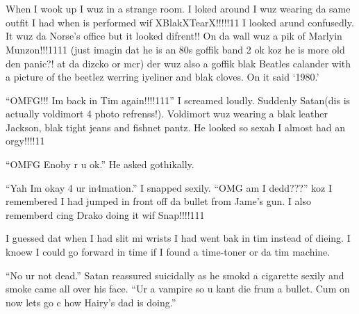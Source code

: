 \section{\chaptername~\thesection}



When I wook up I wuz in a strange room. I loked around I wuz wearing da same outfit I had when is performed wif XBlakXTearX!!!!!11 I looked arund confusedly. It wuz da Norse's office but it looked difrent!! On da wall wuz a pik of Marlyin Munzon!!!1111 (just imagin dat he is an 80s goffik band 2 ok koz he is more old den panic?! at da dizcko or mcr) der wuz also a goffik blak Beatles calander with a picture of the beetlez werring iyeliner and blak cloves. On it said \enquote*{1980.}

\enquote{OMFG!!! Im back in Tim again!!!!111} I screamed loudly. Suddenly Satan(dis is actually voldimort 4 photo refrenss!). Vol\-di\-mort wuz wearing a blak leather Jackson, blak tight jeans and fishnet pantz. He looked so sexah I almost had an orgy!!!!11

\enquote{OMFG Enoby r u ok.} He asked gothikally.

\enquote{Yah Im okay 4 ur in4mation.} I snapped sexily. \enquote{OMG am I dedd???} koz I remembered I had jumped in front off da bullet from Jame's gun. I also rememberd cing Drako doing it wif Snap!!!!111

I guessed dat when I had slit mi wrists I had went bak in tim instead of dieing. I knoew I could go forward in time if I found a time-toner or da tim machine.

\enquote{No ur not dead.} Satan reassured suicidally as he smokd a cigarette sexily and smoke came all over his face. \enquote{Ur a vampire so u kant die frum a bullet. Cum on now lets go c how Hairy's dad is doing.}


